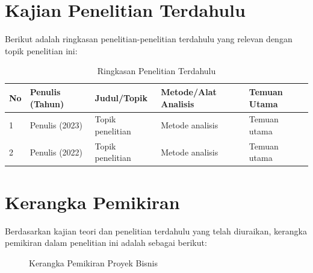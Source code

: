\section{Kajian Penelitian Terdahulu}
\label{sec:kajian-terdahulu-bisnis}

Berikut adalah ringkasan penelitian-penelitian terdahulu yang relevan dengan topik
penelitian ini:

\begin{table}[H]
\caption{Ringkasan Penelitian Terdahulu}
\label{tab:penelitian-terdahulu-pb}
\begin{isitable}
\begin{tabular}{p{0.5cm} p{3cm} p{4cm} p{3cm} p{3.5cm}}
\toprule
\textbf{No} & \textbf{Penulis (Tahun)} & \textbf{Judul/Topik} & \textbf{Metode/Alat Analisis} & \textbf{Temuan Utama} \\
\midrule
1 & Penulis (2023) & Topik penelitian & Metode analisis & Temuan utama \\
2 & Penulis (2022) & Topik penelitian & Metode analisis & Temuan utama \\
\bottomrule
\end{tabular}
\end{isitable}
\end{table}

\section{Kerangka Pemikiran}
\label{sec:kerangka-bisnis}

Berdasarkan kajian teori dan penelitian terdahulu yang telah diuraikan, kerangka
pemikiran dalam penelitian ini adalah sebagai berikut:

\begin{figure}[H]
\centering
\caption{Kerangka Pemikiran Proyek Bisnis}
\label{fig:kerangka-bisnis}
\end{figure}
